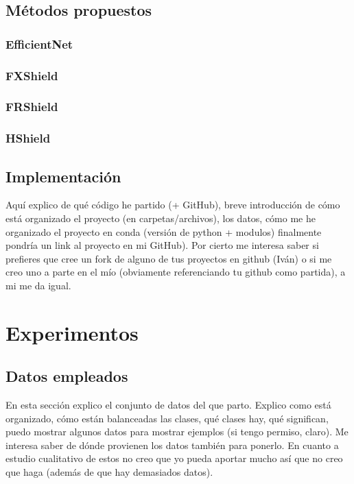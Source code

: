 \clearpage
\section{Métodos propuestos} \label{sec:metodospropuestos}
\subsection{EfficientNet}
\subsection{FXShield}
\subsection{FRShield}
\subsection{HShield}

\clearpage

\section{Implementación}

Aquí explico de qué código he partido (+ GitHub), breve introducción de cómo está organizado el proyecto (en carpetas/archivos), los datos, cómo me he organizado el proyecto en conda (versión de python + modulos) finalmente pondría un link al proyecto en mi GitHub). Por cierto me interesa saber si prefieres que cree un fork de alguno de tus proyectos en github (Iván) o si me creo uno a parte en el mío (obviamente referenciando tu github como partida), a mi me da igual.



\clearpage


\newpage
\chapter{Experimentos} \label{cap:exp}


\section{Datos empleados} \label{sec:datos}
En esta sección explico el conjunto de datos del que parto. Explico como está organizado, cómo están balanceadas las clases, qué clases hay, qué significan, puedo mostrar algunos datos para mostrar ejemplos (si tengo permiso, claro). Me interesa saber de dónde provienen los datos también para ponerlo. En cuanto a estudio cualitativo de estos no creo que yo pueda aportar mucho así que no creo que haga (además de que hay demasiados datos).
